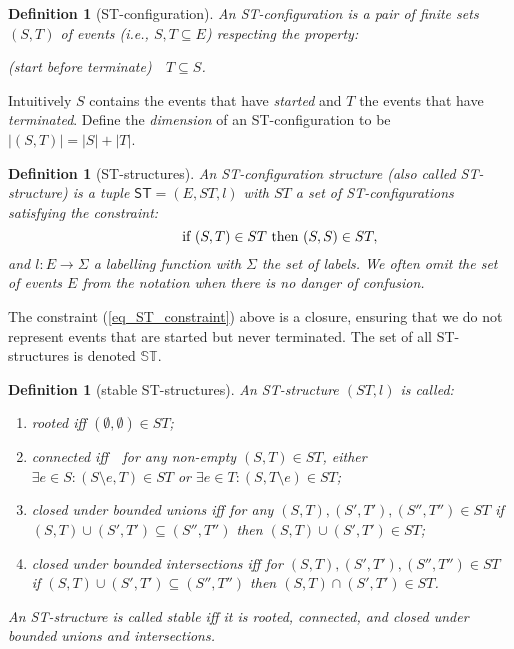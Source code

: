 \documentclass[submission,copyright,creativecommons]{eptcs}
\newtheorem{definition}[theorem]{Definition}
\newcommand{\refeq}[1]{(\ref{#1})}
\newcommand\ST{\ensuremath{\mathsf{ST}}}
\newcommand\allST{\ensuremath{\mathbb{ST}}}
\begin{document}
\begin{definition}[ST-configuration]\label{def_STconfig}
An \emph{ST-configuration} is a pair of finite sets $(S,T)$ 
 of events (i.e., $S,T\subseteq E$) 
respecting the property:
\begin{center}
(start before terminate)\ \ $T\subseteq S$.
\end{center}
\end{definition}

Intuitively $S$ contains the events that have \textit{started} and $T$ the events that have \textit{terminated}.
Define the \emph{dimension} of an ST-configuration to be $|(S,T)|=|S|+|T|$.

\begin{definition}[ST-structures]\label{def_st_structs}
An \emph{ST-configuration structure} (also called \emph{ST-structure}) is a tuple $\ST=(E,ST,l)$ with $ST$ a set of ST-configurations satisfying the \emph{constraint}:
\begin{equation}
\hspace{6ex}\mbox{ if } (S,T)\in ST \mbox{ then }(S,S)\in ST, \label{eq_ST_constraint}
\end{equation}
and  $l:E\rightarrow \Sigma$ a labelling function with $\Sigma$ the set of labels.
We often omit the set of events $E$ from the notation when there is no danger of confusion.
\end{definition}

The constraint \refeq{eq_ST_constraint} above is a closure, ensuring that we do not represent events that are started but never terminated. The set of all ST-structures is denoted \allST.


\begin{definition}[stable ST-structures]\label{def_stableST}
An ST-structure $(ST,l)$ is called:
\begin{enumerate}
 \item\label{def_stableST_rooted} \emph{rooted} iff $(\emptyset,\emptyset)\in ST$;
\item\label{def_stableST_connected} \emph{connected} iff\ \, for any non-empty $(S,T)\!\in\!ST$, either $\exists e\!\in\!S:(S\setminus\!e,T)\!\in\!ST$ or $\exists e\!\in\!T:(S,T\setminus\!e)\!\in\!ST$;
\item \emph{closed under bounded unions} iff for any $(S,T),(S',T'),(S'',T'')\in ST$ if $(S,T)\cup(S',T')\subseteq(S'',T'')$ then $(S,T)\cup(S',T')\in ST$;
\item \emph{closed under bounded intersections} iff for $(S,T),(S',T'),(S'',T'')\in ST$ if $(S,T)\cup(S',T')\subseteq(S'',T'')$ then $(S,T)\cap(S',T')\in ST$.
\end{enumerate}
An ST-structure is called \emph{stable} iff it is rooted, connected, and closed under bounded unions and intersections.
\end{definition}
\end{document}
